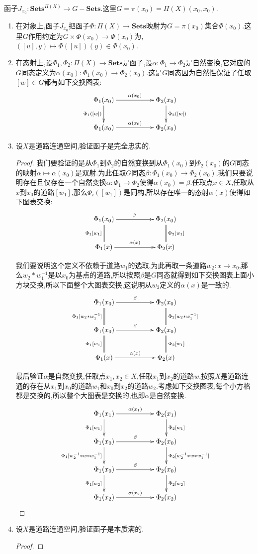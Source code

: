 函子$J_{x_0}:\textbf{Sets}^{\Pi(X)}\to G-\textbf{Sets}$.这里$G=\pi(x_0)=\Pi(X)(x_0,x_0)$.
\begin{enumerate}
	\item 在对象上,函子$J_{x_0}$把函子$\Phi:\Pi(X)\to\textbf{Sets}$映射为$G=\pi(x_0)$集合$\Phi(x_0)$.这里$G$作用约定为$G\times\Phi(x_0)\to\Phi(x_0)$为,$([u],y)\mapsto\Phi([u])(y)\in\Phi(x_0)$.
	\item 在态射上,设$\Phi_1,\Phi_2:\Pi(X)\to\textbf{Sets}$是函子,设$\alpha:\Phi_1\to\Phi_2$是自然变换,它对应的$G$同态定义为$\alpha(x_0):\Phi_1(x_0)\to\Phi_2(x_0)$.这是$G$同态因为自然性保证了任取$[w]\in G$都有如下交换图表:
	$$\xymatrix{\Phi_1(x_0)\ar[rr]^{\alpha(x_0)}\ar[d]_{\Phi_1([w])}&&\Phi_2(x_0)\ar[d]^{\Phi_2([w])}\\\Phi_1(x_0)\ar[rr]^{\alpha(x_0)}&&\Phi_2(x_0)}$$
	\item 设$X$是道路连通空间,验证函子是完全忠实的.
	\begin{proof}
		
		我们要验证的是从$\Phi_1$到$\Phi_2$的自然变换到从$\Phi_1(x_0)$到$\Phi_2(x_0)$的$G$同态的映射$\alpha\mapsto\alpha(x_0)$是双射.为此任取$G$同态$\beta:\Phi_1(x_0)\to\Phi_2(x_0)$,我们只要说明存在且仅存在一个自然变换$\alpha:\Phi_1\to\Phi_2$使得$\alpha(x_0)=\beta$.任取点$x\in X$,任取从$x$到$x_0$的道路$[w_1]$,那么$\Phi_i([w_1])$是同构,所以存在唯一的态射$\alpha(x)$使得如下图表交换:
		$$\xymatrix{\Phi_1(x_0)\ar[rr]^{\beta}\ar@{=}[d]_{\Phi_1[w_1]}&&\Phi_2(x_0)\ar@{=}[d]^{\Phi_2[w_1]}\\\Phi_1(x)\ar[rr]^{\alpha(x)}&&\Phi_2(x)}$$
		
		我们要说明这个定义不依赖于道路$w_1$的选取,为此再取一条道路$w_2:x\to x_0$,那么$w_2\ast w_1^{-1}$是以$x_0$为基点的道路,所以按照$\beta$是$G$同态就得到如下交换图表上面小方块交换,所以下面整个大图表交换,这说明从$w_2$定义的$\alpha(x)$是一致的.
		$$\xymatrix{\Phi_1(x_0)\ar[rr]^{\beta}\ar@{=}[d]_{\Phi_1[w_2\ast w_1^{-1}]}&&\Phi_2(x_0)\ar@{=}[d]^{\Phi_2[w_2\ast w_1^{-1}]}\\\Phi_1(x_0)\ar[rr]^{\beta}\ar@{=}[d]_{\Phi_1[w_1]}&&\Phi_2(x_0)\ar@{=}[d]^{\Phi_2[w_1]}\\\Phi_1(x)\ar[rr]^{\alpha(x)}&&\Phi_2(x)}$$
		
		最后验证$\alpha$是自然变换,任取点$x_1,x_2\in X$,任取$x_1$到$x_2$的道路$w$,按照$X$是道路连通的存在从$x_1$到$x_0$的道路$w_1$和$x_0$到$x_2$的道路$w_2$.考虑如下交换图表,每个小方格都是交换的,所以整个大图表是交换的,也即$\alpha$是自然变换.
		$$\xymatrix{\Phi_1(x_1)\ar[rr]^{\alpha(x_1)}\ar[d]_{\Phi_1[w_1]}&&\Phi_2(x_1)\ar[d]^{\Phi_2[w_1]}\\\Phi_1(x_0)\ar[rr]^{\beta}\ar[d]_{\Phi_1[w_2^{-1}\ast w\ast w_1^{-1}]}&&\Phi_2(x_0)\ar[d]^{\Phi_2[w_2^{-1}\ast w\ast w_1^{-1}]}\\\Phi_1(x_0)\ar[rr]^{\beta}\ar[d]_{\Phi_1[w_2]}&&\Phi_2(x_0)\ar[d]^{\Phi_2[w_2]}\\\Phi_1(x_2)\ar[rr]^{\alpha(x_2)}&&\Phi_2(x_2)}$$
	\end{proof}
	\item 设$X$是道路连通空间,验证函子是本质满的.
	\begin{proof}
		

\end{proof}
\end{enumerate}
